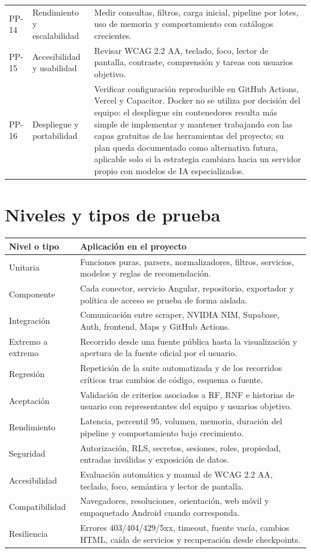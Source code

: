 \documentclass[11pt,a4paper]{article}
\begin{document}
\begin{longtable}{@{}L{1.4cm}L{4.1cm}L{9.4cm}@{}}
PP-14 & Rendimiento y escalabilidad & Medir consultas, filtros, carga inicial, pipeline por lotes, uso de memoria y comportamiento con catálogos crecientes. \\
PP-15 & Accesibilidad y usabilidad & Revisar WCAG 2.2 AA, teclado, foco, lector de pantalla, contraste, comprensión y tareas con usuarios objetivo. \\
PP-16 & Despliegue y portabilidad & Verificar configuración reproducible en GitHub Actions, Vercel y Capacitor. Docker no se utiliza por decisión del equipo: el despliegue sin contenedores resulta más simple de implementar y mantener trabajando con las capas gratuitas de las herramientas del proyecto; su plan queda documentado como alternativa futura, aplicable solo si la estrategia cambiara hacia un servidor propio con modelos de IA especializados. \\
\bottomrule
\end{longtable}

\section{Niveles y tipos de prueba}

\begin{longtable}{@{}L{3.3cm}L{11.5cm}@{}}
\toprule
\textbf{Nivel o tipo} & \textbf{Aplicación en el proyecto} \\
\midrule
\endhead
Unitaria & Funciones puras, parsers, normalizadores, filtros, servicios, modelos y reglas de recomendación. \\
Componente & Cada conector, servicio Angular, repositorio, exportador y política de acceso se prueba de forma aislada. \\
Integración & Comunicación entre scraper, NVIDIA NIM, Supabase, Auth, frontend, Maps y GitHub Actions. \\
Extremo a extremo & Recorrido desde una fuente pública hasta la visualización y apertura de la fuente oficial por el usuario. \\
Regresión & Repetición de la suite automatizada y de los recorridos críticos tras cambios de código, esquema o fuente. \\
Aceptación & Validación de criterios asociados a RF, RNF e historias de usuario con representantes del equipo y usuarios objetivo. \\
Rendimiento & Latencia, percentil 95, volumen, memoria, duración del pipeline y comportamiento bajo crecimiento. \\
Seguridad & Autorización, RLS, secretos, sesiones, roles, propiedad, entradas inválidas y exposición de datos. \\
Accesibilidad & Evaluación automática y manual de WCAG 2.2 AA, teclado, foco, semántica y lector de pantalla. \\
Compatibilidad & Navegadores, resoluciones, orientación, web móvil y empaquetado Android cuando corresponda. \\
Resiliencia & Errores 403/404/429/5xx, timeout, fuente vacía, cambios HTML, caída de servicios y recuperación desde checkpoints. \\
\bottomrule
\end{longtable}
\end{document}
